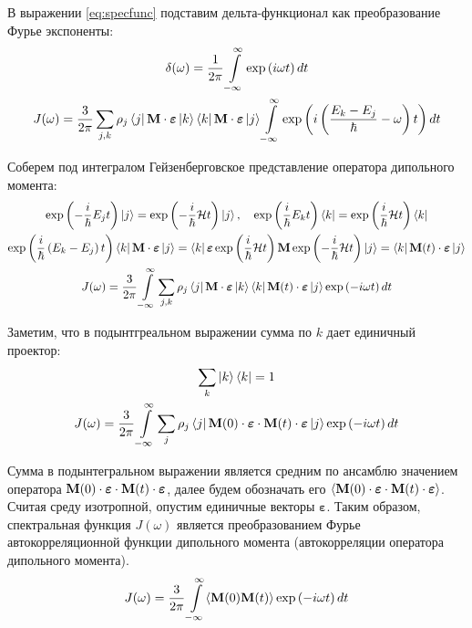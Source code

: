 В выражении \ref{eq:specfunc} подставим дельта-функционал как преобразование Фурье экспоненты: 
\vverh
\begin{gather}
	\delta(\omega) = \frac{1}{2 \pi} \int\limits_{-\infty}^{\infty} \exp \left( i \omega t \right) dt \notag \\
	J(\omega) = \frac{3}{2 \pi} \sum_{j, k} \rho_j \bra{j} \mathbf{M} \cdot \boldsymbol{\varepsilon} \ket{k} \bra{k} \mathbf{M} \cdot \boldsymbol{\varepsilon} \ket{j} \int\limits_{-\infty}^{\infty} \exp \left( i \left( \frac{E_k - E_j}{\hbar} - \omega \right) t \right) dt \notag
\end{gather}

Соберем под интегралом Гейзенберговское представление оператора дипольного момента:
\vverh
\begin{gather}
	\exp \left( - \frac{i}{\hbar} E_j t \right) \ket{j} = \exp \left( - \frac{i}{\hbar} \mathcal{H} t \right) \ket{j}, \quad \exp \left( \frac{i}{\hbar} E_k t \right) \bra{k} = \exp \left( \frac{i}{\hbar} \mathcal{H} t \right) \bra{k} \notag \\
	\exp \left( \frac{i}{\hbar} \left( E_k - E_j \right) t \right) \bra{k} \mathbf{M} \cdot \boldsymbol{\varepsilon} \ket{j} = \bra{k} \boldsymbol{\varepsilon} \exp \left( \frac{i}{\hbar} \mathcal{H} t \right) \mathbf{M} \exp \left( - \frac{i}{\hbar} \mathcal{H} t \right) \ket{j} = \bra{k} \mathbf{M}(t) \cdot \boldsymbol{\varepsilon} \ket{j} \notag \\
	J(\omega) = \frac{3}{2 \pi} \int\limits_{-\infty}^{\infty} \sum_{j, k} \rho_j \bra{j} \mathbf{M} \cdot \boldsymbol{\varepsilon} \ket{k} \bra{k} \mathbf{M}(t) \cdot \boldsymbol{\varepsilon} \ket{j} \exp \left( - i \omega t \right) dt \label{eq:specfunc2} 
\end{gather}

Заметим, что в подынтгреальном выражении сумма по $k$ дает единичный проектор:
\begin{gather}
	\sum_k \ket{k} \bra{k} = 1 \notag \\
	J(\omega) = \frac{3}{2 \pi} \int\limits_{-\infty}^{\infty} \sum_j \rho_j \bra{j}  \mathbf{M}(0) \cdot \boldsymbol{\varepsilon} \cdot \mathbf{M}(t) \cdot \boldsymbol{\varepsilon} \ket{j} \exp \left( - i \omega t \right) dt \notag
\end{gather}

Сумма в подынтегральном выражении является средним по ансамблю значением оператора $\mathbf{M}(0) \cdot \boldsymbol{\varepsilon} \cdot \mathbf{M}(t) \cdot \boldsymbol{\varepsilon}$, далее будем обозначать его $\langle \mathbf{M}(0) \cdot \boldsymbol{\varepsilon} \cdot \mathbf{M}(t) \cdot \boldsymbol{\varepsilon} \rangle$. Считая среду изотропной, опустим единичные векторы $\boldsymbol{\varepsilon}$. Таким образом, спектральная функция $J(\omega)$ является преобразованием Фурье автокорреляционной функции дипольного момента (автокорреляции оператора дипольного момента). 
\vverh
\begin{gather}
	J(\omega) = \frac{3}{2 \pi} \int\limits_{-\infty}^{\infty} \langle \mathbf{M}(0) \mathbf{M}(t) \rangle \exp \left( - i \omega t \right) dt \notag
\end{gather}


